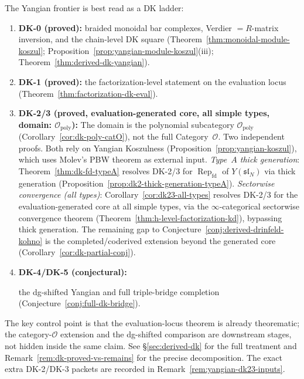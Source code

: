 \begin{remark}\label{rem:derived-dk-scope}
The Yangian frontier is best read as a DK ladder:
\begin{enumerate}[label=\textup{(\alph*)}]
\item \textbf{DK-0 (proved):} braided monoidal bar complexes,
  Verdier $= R$-matrix inversion, and the chain-level DK square
  (Theorem~\ref{thm:monoidal-module-koszul};
  Proposition~\ref{prop:yangian-module-koszul}(iii);
  Theorem~\ref{thm:derived-dk-yangian}).
\item \textbf{DK-1 (proved):} the factorization-level statement on the
  evaluation locus (Theorem~\ref{thm:factorization-dk-eval}).
\item \textbf{DK-2/3 (proved, evaluation-generated core, all simple types, domain: $\mathcal{O}_{\mathrm{poly}}$):}
  The domain is the polynomial subcategory
  $\mathcal{O}_{\mathrm{poly}}$
  (Corollary~\ref{cor:dk-poly-catO}), not the full
  Category~$\mathcal{O}$.
  Two independent proofs.  Both rely on Yangian Koszulness
  (Proposition~\ref{prop:yangian-koszul}), which uses Molev's PBW
  theorem \cite{molev-yangians} as external input.
  \emph{Type~$A$ thick generation}:
  Theorem~\ref{thm:dk-fd-typeA} resolves DK-2/3 for
  $\operatorname{Rep}_{\mathrm{fd}}$ of $Y(\mathfrak{sl}_N)$
  via thick generation
  (Proposition~\ref{prop:dk2-thick-generation-typeA}).
  \emph{Sectorwise convergence (all types)}:
  Corollary~\ref{cor:dk23-all-types} resolves DK-2/3
  for the evaluation-generated core at all
  simple types, via the $\infty$-categorical sectorwise
  convergence theorem
  (Theorem~\ref{thm:h-level-factorization-kd}), bypassing
  thick generation.  The remaining gap to
  Conjecture~\ref{conj:derived-drinfeld-kohno} is the
  completed/coderived extension beyond the generated core
  (Corollary~\ref{cor:dk-partial-conj}).
\item \textbf{DK-4/DK-5 (conjectural):}\par the dg-shifted Yangian and
  full triple-bridge completion
  (Conjecture~\ref{conj:full-dk-bridge}).
\end{enumerate}
The key control point is that the evaluation-locus theorem is already
theorematic; the category-$\mathcal{O}$ extension and the dg-shifted
comparison are downstream stages, not hidden inside the same claim.
See \S\ref{sec:derived-dk} for the full treatment and
Remark~\ref{rem:dk-proved-vs-remains} for the precise decomposition.
The exact extra DK-2/DK-3 packets are recorded in
Remark~\ref{rem:yangian-dk23-inputs}.


\end{remark}
